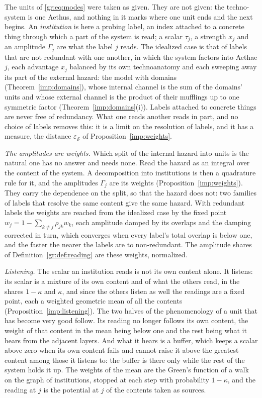 The units of \eqref{gr:eq:modes} were taken as given. They are not given:
the techno-system is one Aethus, and nothing in it marks where one unit
ends and the next begins. An \emph{institution} is here a probing label,
an index attached to a concrete thing through which a part of the system
is read; a scalar $\tau_j$, a strength $x_j$ and an amplitude $\Gamma_j$
are what the label $j$ reads. The idealized case is that of labels that
are not redundant with one another, in which the system factors into
Aethae $j$, each advantage $x_j$ balanced by its own technoanatomy and
each sweeping away its part of the external hazard: the model with
domains (Theorem~\ref{imp:domains}), whose internal channel is the sum of the domains'
units and whose external channel is the product of their mufflings up to
one symmetric factor (Theorem~\ref{imp:domains}(i)). Labels attached to concrete things
are never free of redundancy. What one reads another reads in part, and
no choice of labels removes this: it is a limit on the resolution of
labels, and it has a measure, the distance $\varepsilon_{\mathcal S}$ of
Proposition~\ref{imp:weights}.

\emph{The amplitudes are weights.} Which split of the internal hazard
into units is the natural one has no answer and needs none. Read the
hazard as an integral over the content of the system. A decomposition
into institutions is then a quadrature rule for it, and the amplitudes
$\Gamma_j$ are its weights (Proposition~\ref{imp:weights}). They carry the dependence on the
split, so that the hazard does not: two families of labels that resolve
the same content give the same hazard. With redundant labels the weights
are reached from the idealized case by the fixed point
$w_j=1-\sum_{k\neq j}\rho_{jk}w_k$, each amplitude damped by its overlaps
and the damping corrected in turn, which converges when every label's
total overlap is below one, and the faster the nearer the labels are to
non-redundant. The amplitude shares of Definition~\ref{gr:def:reading}
are these weights, normalized.

\emph{Listening.} The scalar an institution reads is not its own content
alone. It listens: its scalar is a mixture of its own content and of what
the others read, in the shares $1-\kappa$ and $\kappa$, and since the
others listen as well the readings are a fixed point, each a weighted
geometric mean of all the contents (Proposition~\ref{imp:listening}). The two halves of the
phenomenology of a unit that has become very good follow. Its reading no
longer follows its own content, the weight of that content in the mean
being below one and the rest being what it hears from the adjacent
layers. And what it hears is a buffer, which keeps a scalar above zero
when its own content fails and cannot raise it above the greatest content
among those it listens to: the buffer is there only while the rest of the
system holds it up. The weights of the mean are the Green's function of a
walk on the graph of institutions, stopped at each step with probability
$1-\kappa$, and the reading at $j$ is the potential at $j$ of the
contents taken as sources.

